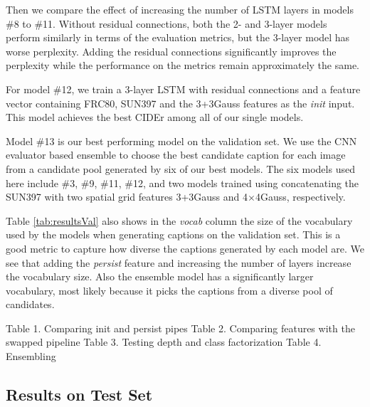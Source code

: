 Then we compare the effect of increasing the number of LSTM layers in models \#8
to \#11. 
Without residual connections, both the 2- and 3-layer models perform similarly
in terms of the evaluation metrics, but the 3-layer model has worse perplexity.
Adding the residual connections significantly improves the perplexity while the
performance on the metrics remain approximately the same.

For model \#12, we train a 3-layer LSTM with residual connections and a feature
vector containing FRC80, SUN397 and the 3+3Gauss features as the \emph{init}
input. This model achieves the best CIDEr among all of our single models.

Model \#13 is our best performing model on the validation set. 
We use the CNN evaluator based ensemble to choose the best candidate caption for
each image from a candidate pool generated by six of our best models.
The six models used here include \#3, \#9, \#11, \#12, and two models trained
using concatenating the SUN397 with two spatial grid features 3+3Gauss and
4$\times$4Gauss, respectively.

Table \ref{tab:resultsVal} also shows in the \emph{vocab} column the size of the
vocabulary used by the models when generating captions on the validation set.
This is a good metric to capture how diverse the captions generated by each
model are. 
We see that adding the \emph{persist} feature and increasing the number of
layers increase the vocabulary size.
Also the ensemble model has a significantly larger vocabulary, most likely
because it picks the captions from a diverse pool of candidates.




Table 1. Comparing init and persist pipes
Table 2. Comparing features with the swapped pipeline 
Table 3. Testing depth and class factorization 
Table 4. Ensembling 

\subsection{Results on Test Set}

